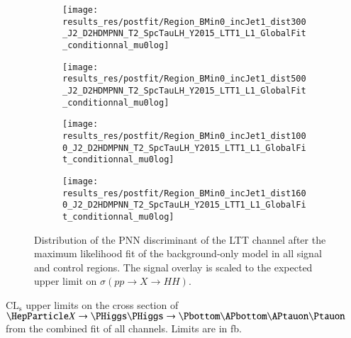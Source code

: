 \begin{figure}[htbp]
  \centering

  \begin{subfigure}{0.495\textwidth}
    \centering

    \texttt{[image: results\_res/postfit/Region\_BMin0\_incJet1\_dist300\_J2\_D2HDMPNN\_T2\_SpcTauLH\_Y2015\_LTT1\_L1\_GlobalFit\_conditionnal\_mu0log]}
  \end{subfigure}\hfill%
  \begin{subfigure}{0.495\textwidth}
    \centering

    \texttt{[image: results\_res/postfit/Region\_BMin0\_incJet1\_dist500\_J2\_D2HDMPNN\_T2\_SpcTauLH\_Y2015\_LTT1\_L1\_GlobalFit\_conditionnal\_mu0log]}
  \end{subfigure}

  \begin{subfigure}{0.495\textwidth}
    \centering

    \texttt{[image: results\_res/postfit/Region\_BMin0\_incJet1\_dist1000\_J2\_D2HDMPNN\_T2\_SpcTauLH\_Y2015\_LTT1\_L1\_GlobalFit\_conditionnal\_mu0log]}
  \end{subfigure}\hfill%
  \begin{subfigure}{0.495\textwidth}
    \centering

    \texttt{[image: results\_res/postfit/Region\_BMin0\_incJet1\_dist1600\_J2\_D2HDMPNN\_T2\_SpcTauLH\_Y2015\_LTT1\_L1\_GlobalFit\_conditionnal\_mu0log]}
  \end{subfigure}

  \caption{Distribution of the PNN discriminant of the \lephad LTT
    channel after the maximum likelihood fit of the background-only
    model in all signal and control regions. The signal overlay is
    scaled to the expected upper limit on $\sigma(pp \to X \to HH)$.}
\end{figure}







\begin{table}[htbp]
  \centering

  
  \caption{$\text{CL}_\text{s}$ upper limits on the cross section of
    $\PX \ra \PHiggs \PHiggs \ra \bbtautau$ from the combined fit of
    all channels. Limits are in fb.}
  \label{tab:comb_limits_resonant}
\end{table}


